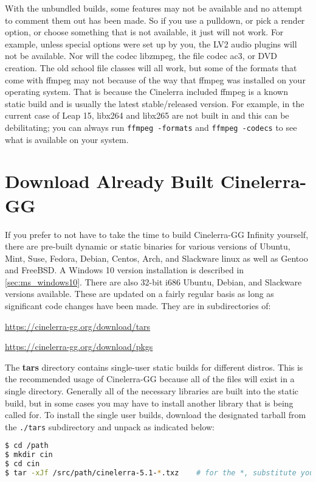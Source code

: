 With the unbundled builds, some features may not be available and no attempt to comment them out has been made.  
So if you use a pulldown, or pick a render option, or choose something that is not available, it just will not work.  
For example, unless special options were set up by you, the LV2 audio plugins will not be available.  
Nor will the codec libzmpeg, the file codec ac3, or DVD creation.  
The old school file classes will all work, but some of the formats that come with ffmpeg may not because of the way that ffmpeg was installed on your operating system.  
That is because the Cinelerra included ffmpeg is a known static build and is usually the latest stable/released version.  
For example, in the current case of Leap 15, libx264 and libx265 are not built in and this can be debilitating; you can always run \texttt{ffmpeg -formats} and \texttt{ffmpeg -codecs} to see what is available on your system.


\section{Download Already Built Cinelerra-GG}%
\label{sec:download_already_built_cinelerra_gg}

If you prefer to not have to take the time to build Cinelerra-GG Infinity yourself, there are pre-built dynamic or static binaries for various versions of Ubuntu, Mint, Suse, Fedora, Debian, Centos, Arch, and Slackware linux as well as Gentoo and FreeBSD.  
A Windows 10 version installation is described in \ref{sec:ms_windows10}.
There are also 32-bit i686 Ubuntu, Debian, and Slackware versions available.  
These are updated on a fairly regular basis as long as significant code changes have been made.  
They are in subdirectories of:

{\small \url{https://cinelerra-gg.org/download/tars}
	
	\url{https://cinelerra-gg.org/download/pkgs}}

The \textbf{tars} directory contains single-user static builds for different distros.  
This is the recommended usage of Cinelerra-GG because all of the files will exist in a single directory.
Generally all of the necessary libraries are built into the static build, but in some cases you may
have to install another library that is being called for.  
To install the single user builds, download the designated tarball from the \texttt{./tars} subdirectory and unpack as indicated below:

\begin{lstlisting}[language=bash,numbers=none]
$ cd /path
$ mkdir cin
$ cd cin
$ tar -xJf /src/path/cinelerra-5.1-*.txz    # for the *, substitute your distro tarball name
\end{lstlisting}


